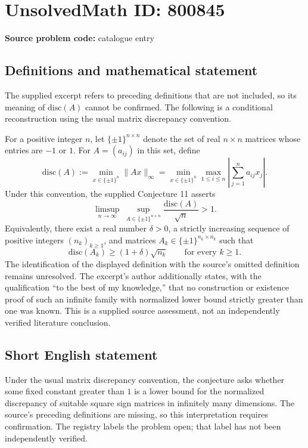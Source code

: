 \documentclass[11pt]{article}
\begin{document}
\section*{UnsolvedMath ID: 800845}
\textbf{Source problem code:} catalogue entry
\subsection{Definitions and mathematical statement}
The supplied excerpt refers to preceding definitions that are not included, so its meaning of \(\mathrm{disc}(A)\) cannot be confirmed. The following is a conditional reconstruction using the usual matrix discrepancy convention.

For a positive integer \(n\), let \(\{\pm1\}^{n\times n}\) denote the set of real \(n\times n\) matrices whose entries are \(-1\) or \(1\). For \(A=(a_{ij})\) in this set, define
\[
\mathrm{disc}(A):=\min_{x\in\{\pm1\}^{n}}\|Ax\|_{\infty}
=\min_{x\in\{\pm1\}^{n}}\max_{1\le i\le n}\left|\sum_{j=1}^{n}a_{ij}x_j\right|.
\]
Under this convention, the supplied Conjecture 11 asserts
\[
\limsup_{n\to\infty}\ \sup_{A\in\{\pm1\}^{n\times n}}\frac{\mathrm{disc}(A)}{\sqrt n}>1.
\]
Equivalently, there exist a real number \(\delta>0\), a strictly increasing sequence of positive integers \((n_k)_{k\ge1}\), and matrices \(A_k\in\{\pm1\}^{n_k\times n_k}\) such that
\[
\mathrm{disc}(A_k)\ge(1+\delta)\sqrt{n_k}\qquad\text{for every }k\ge1.
\]
The identification of the displayed definition with the source's omitted definition remains unresolved. The excerpt's author additionally states, with the qualification ``to the best of my knowledge,'' that no construction or existence proof of such an infinite family with normalized lower bound strictly greater than one was known. This is a supplied source assessment, not an independently verified literature conclusion.
\subsection{Short English statement}
Under the usual matrix discrepancy convention, the conjecture asks whether some fixed constant greater than \(1\) is a lower bound for the normalized discrepancy of suitable square sign matrices in infinitely many dimensions. The source's preceding definitions are missing, so this interpretation requires confirmation. The registry labels the problem open; that label has not been independently verified.
\end{document}
